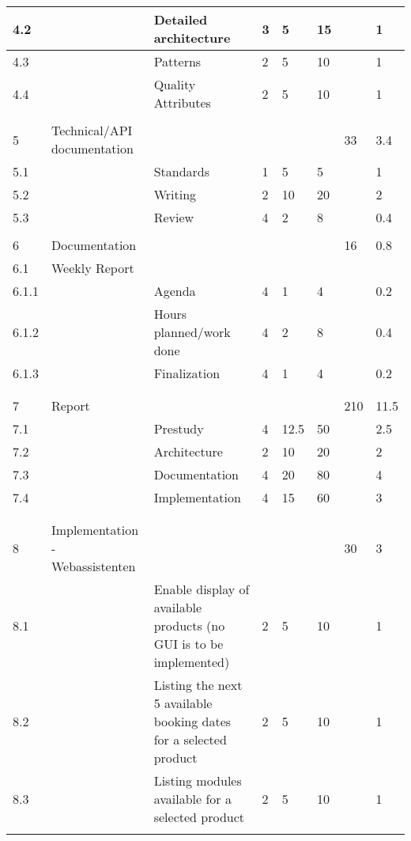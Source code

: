 \begin{table}
\begin{tabular}{|p{0.5cm}|p{2cm}|p{2cm}|p{2cm}|p{2cm}|p{2cm}|p{2cm}|p{2cm}|}
\hline
4.2 &  & Detailed architecture & 3 & 5 & 15 &  & 1\\ 
\hline
4.3 &  & Patterns & 2 & 5 & 10 &  & 1\\ 
\hline
4.4 &  & Quality Attributes & 2 & 5 & 10 &  & 1\\ 
\hline
 &  &  &  &  &  &  & \\ 
\hline
5 & Technical/API documentation &  &  &  &  & 33 & 3.4\\ 
\hline
5.1 &  & Standards & 1 & 5 & 5 &  & 1\\ 
\hline
5.2 &  & Writing & 2 & 10 & 20 &  & 2\\ 
\hline
5.3 &  & Review & 4 & 2 & 8 &  & 0.4\\ 
\hline
 &  &  &  &  &  &  & \\ 
\hline
6 & Documentation &  &  &  &  & 16 & 0.8\\ 
\hline
6.1 & Weekly Report &  &  &  &  &  & \\ 
\hline
6.1.1 &  & Agenda & 4 & 1 & 4 &  & 0.2\\ 
\hline
6.1.2 &  & Hours planned/work done & 4 & 2 & 8 &  & 0.4\\ 
\hline
6.1.3 &  & Finalization & 4 & 1 & 4 &  & 0.2\\ 
\hline
 &  &  &  &  &  &  & \\ 
\hline
 &  &  &  &  &  &  & \\ 
\hline
7 & Report &  &  &  &  & 210 & 11.5\\ 
\hline
7.1 &  & Prestudy & 4 & 12.5 & 50 &  & 2.5\\ 
\hline
7.2 &  & Architecture & 2 & 10 & 20 &  & 2\\ 
\hline
7.3 &  & Documentation & 4 & 20 & 80 &  & 4\\ 
\hline
7.4 &  & Implementation & 4 & 15 & 60 &  & 3\\ 
\hline
 &  &  &  &  &  &  & \\ 
\hline
 &  &  &  &  &  &  & \\ 
\hline
8 & Implementation - Webassistenten &  &  &  &  & 30 & 3\\ 
\hline
8.1 &  & Enable display of available products (no GUI is to be implemented) & 2 & 5 & 10 &  & 1\\ 
\hline
8.2 &  & Listing the next 5 available booking dates for a selected product & 2 & 5 & 10 &  & 1\\ 
\hline
8.3 &  & Listing modules available for a selected product & 2 & 5 & 10 &  & 1\\ 
\hline
 &  &  &  &  &  &  & \\ 

\end{tabular}
\end{table}
